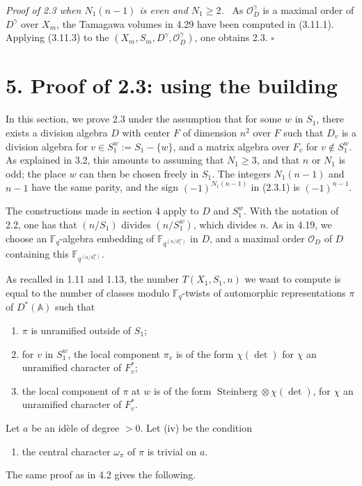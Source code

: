 \documentclass[10pt]{article}
\newcommand{\Fq}{\mathbb F_q}
\newcommand{\Adele}{\mathbb A}
\newcommand{\OD}{\mathcal O_D}
\theoremstyle{deligne}
\newenvironment{proofdel}[1][Proof.]{\textit{#1}\ }{\hfill$\square$}
\newcommand{\Stein}{\operatorname{Steinberg}}
\newcommand{\heading}[1]{\vspace{0.7em}\noindent{\bfseries #1}\quad}
\begin{document}
\begin{proofdel}[Proof of 2.3 when $N_1(n-1)$ is even and $N_1\ge2$.]
As $\OD^\gamma$ is a maximal order of $D^\gamma$ over $X_m$, the Tamagawa volumes in 4.29 have been computed in (3.11.1). Applying (3.11.3) to the $(X_m,S_m,D^\gamma,\OD^\gamma)$, one obtains 2.3.
\end{proofdel}

\section*{5. Proof of 2.3: using the building}

In this section, we prove 2.3 under the assumption that for some $w$ in $S_1$, there exists a division algebra $D$ with center $F$ of dimension $n^2$ over $F$ such that $D_v$ is a division algebra for $v\in S_1^w:=S_1-\{w\}$, and a matrix algebra over $F_v$ for $v\notin S_1^w$. As explained in 3.2, this amounts to assuming that $N_1\ge3$, and that $n$ or $N_1$ is odd; the place $w$ can then be chosen freely in $S_1$. The integers $N_1(n-1)$ and $n-1$ have the same parity, and the sign $(-1)^{N_1(n-1)}$ in (2.3.1) is $(-1)^{n-1}$.

The constructions made in section 4 apply to $D$ and $S_1^w$. With the notation of 2.2, one has that $(n/S_1)$ divides $(n/S_1^w)$, which divides $n$. As in 4.19, we choose an $\Fq$-algebra embedding of $\mathbb F_{q^{(n/S_1^w)}}$ in $D$, and a maximal order $\OD$ of $D$ containing this $\mathbb F_{q^{(n/S_1^w)}}$.

\heading{5.1.} As recalled in 1.11 and 1.13, the number $T(X_1,S_1,n)$ we want to compute is equal to the number of classes modulo $\Fq$-twists of automorphic representations $\pi$ of $D^*(\Adele)$ such that
\begin{enumerate}[label=(\roman*)]
\item $\pi$ is unramified outside of $S_1$;
\item for $v$ in $S_1^w$, the local component $\pi_v$ is of the form $\chi(\det)$ for $\chi$ an unramified character of $F_v^*$;
\item the local component of $\pi$ at $w$ is of the form $\Stein\otimes\chi(\det)$, for $\chi$ an unramified character of $F_v^*$.
\end{enumerate}
Let $a$ be an id\`ele of degree $>0$. Let (iv) be the condition
\begin{enumerate}[label=(\roman*),start=4]
\item the central character $\omega_\pi$ of $\pi$ is trivial on $a$.
\end{enumerate}
The same proof as in 4.2 gives the following.
\end{document}
